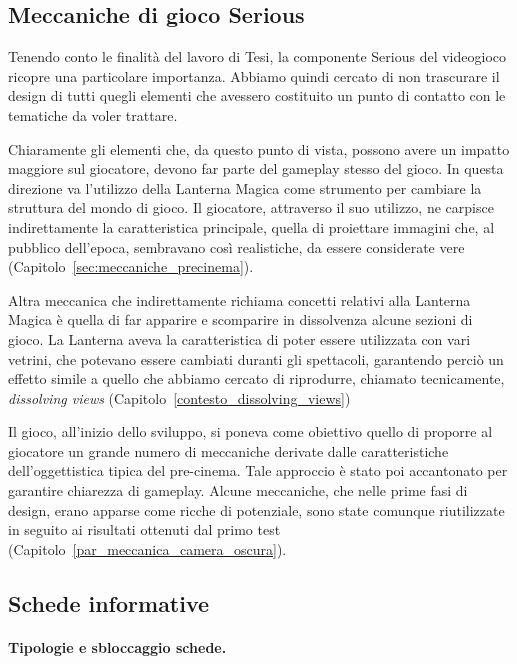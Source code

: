 \subsection{Meccaniche di gioco Serious}
\label{sec:meccaniche_serious}

Tenendo conto le finalità del lavoro di Tesi, la componente Serious del videogioco ricopre una particolare importanza. Abbiamo quindi cercato di non trascurare il design di tutti quegli elementi che avessero costituito un punto di contatto con le tematiche da voler trattare.

Chiaramente gli elementi che, da questo punto di vista, possono avere un impatto maggiore sul giocatore, devono far parte del gameplay stesso del gioco. In questa direzione va l’utilizzo della Lanterna Magica come strumento per cambiare la struttura del mondo di gioco. Il giocatore, attraverso il suo utilizzo, ne carpisce indirettamente la caratteristica principale, quella di proiettare immagini che, al pubblico dell’epoca, sembravano così realistiche, da essere considerate vere (Capitolo~\ref{sec:meccaniche_precinema}).

Altra meccanica che indirettamente richiama concetti relativi alla Lanterna Magica è quella di far apparire e scomparire in dissolvenza alcune sezioni di gioco. La Lanterna aveva la caratteristica di poter essere utilizzata con vari vetrini, che potevano essere cambiati duranti gli spettacoli, garantendo perciò un effetto simile a quello che abbiamo cercato di riprodurre, chiamato tecnicamente, \textit{dissolving views} (Capitolo~\ref{contesto_dissolving_views})

Il gioco, all’inizio dello sviluppo, si poneva come obiettivo quello di proporre al giocatore un grande numero di meccaniche derivate dalle caratteristiche dell’oggettistica tipica del pre-cinema. Tale approccio è stato poi accantonato per garantire chiarezza di gameplay. Alcune meccaniche, che nelle prime fasi di design, erano apparse come ricche di potenziale, sono state comunque riutilizzate in seguito ai risultati ottenuti dal primo test (Capitolo~\ref{par_meccanica_camera_oscura}).

\subsection{Schede informative}
\label{sec:schede_informative}

\paragraph{Tipologie e sbloccaggio schede.}
\label{par:tipologie_schede}

